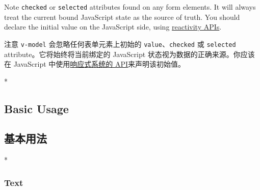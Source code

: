 \begin{paracol}{2}
\begin{vueQuote}{Note}
    \texttt{checked} or \texttt{selected} attributes found on any form
    elements. It will always treat the current bound JavaScript state as the
    source of truth. You should declare the initial value on the JavaScript
    side, using
    \href{https://vuejs.org/api/reactivity-core.html\#reactivity-api-core}{reactivity
    APIs}.
    \end{vueQuote}
\switchcolumn
\begin{vueQuote}{注意}
\texttt{v-model} 会忽略任何表单元素上初始的
\texttt{value}、\texttt{checked} 或 \texttt{selected}
attribute。它将始终将当前绑定的 JavaScript
状态视为数据的正确来源。你应该在 JavaScript
中使用\href{https://cn.vuejs.org/api/reactivity-core.html\#reactivity-api-core}{响应式系统的
API}来声明该初始值。
\end{vueQuote}


\switchcolumn[0]*%
\subsection{Basic Usage}
\switchcolumn
\subsection{基本用法}
\switchcolumn[0]*%
\subsubsection{Text}
\switchcolumn

\end{paracol}

